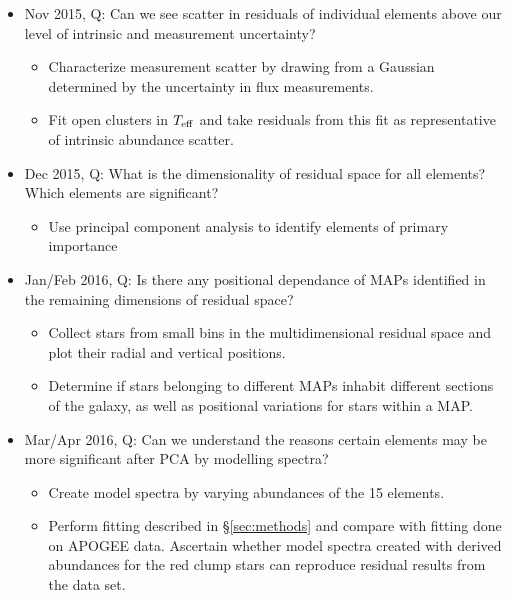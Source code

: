\documentclass[preprint]{aastex}
\begin{document}
\begin{itemize}
\item Nov 2015, Q: Can we see scatter in residuals of individual elements above our level of intrinsic and measurement uncertainty?
\begin{itemize}
\item Characterize measurement scatter by drawing from a Gaussian determined by the uncertainty in flux measurements.
\item Fit open clusters in $T_{\rm eff}$ and take residuals from this fit as representative of intrinsic abundance scatter.
\end{itemize}
\item Dec 2015, Q: What is the dimensionality of residual space for all elements? Which elements are significant?
\begin{itemize}
\item Use principal component analysis to identify elements of primary importance
\end{itemize}
\item Jan/Feb 2016, Q: Is there any positional dependance of MAPs identified in the remaining dimensions of residual space?
\begin{itemize}
\item Collect stars from small bins in the multidimensional residual space and plot their radial and vertical positions.
\item Determine if stars belonging to different MAPs inhabit different sections of the galaxy, as well as positional variations for stars within a MAP.
\end{itemize}
\item Mar/Apr 2016, Q: Can we understand the reasons certain elements may be more significant after PCA by modelling spectra?
\begin{itemize}
\item Create model spectra by varying abundances of the 15 elements.
\item Perform fitting described in \S\ref{sec:methods} and compare with fitting done on APOGEE data. Ascertain whether model spectra created with derived abundances for the red clump stars can reproduce residual results from the data set.
\end{itemize}
\end{itemize}
\end{document}
